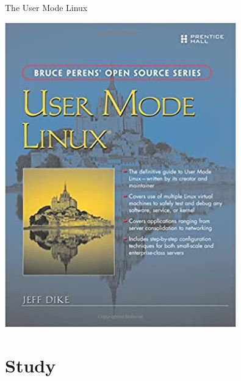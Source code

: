 \documentclass{beamer}
\begin{document}
\begin{CJK*}{UTF8}{bsmi}
\begin{frame}{The User Mode Linux}
\begin{multicols*}{2}
            \includegraphics[trim=0 0 0 1cm, width=\linewidth]{the_user_mode_linux.jpg}
        \end{multicols*}

    \end{frame}


    \section{Study}
     {
      

      {\fontsize{0cm}{0cm} }
     }


\end{CJK*}
\end{document}
